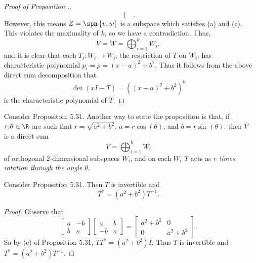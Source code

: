 \documentclass[linearalgebraII]{subfiles}
\begin{document}
\begin{proof}[Proof of Proposition \thechapter.\thestcounter]
\begin{equation*}
\begin{cases}
            \end{cases}.
        \end{equation*}
        However, this means $Z = \spn\left\lbrace v,w \right\rbrace$ is a subspace which satisfies (a) and (c). This violates the maximality of $k$, so we have a contradiction. Thus,
        \begin{equation*}
            V = W = \bigoplus^{k}_{i=1} W_i,
        \end{equation*}
        and it is clear that each $T_i:W_i\to W_i$, the restriction of $T$ on $W_i$, has characteristic polynomial $p_i = p = \left( x-a \right) ^{2} + b^{2}$. Thus it follows from the above direct sum decomposition that
        \begin{equation*}
            \det\left( xI-T \right) = \left( \left( x-a \right) ^{2} +b^{2}  \right) ^k
        \end{equation*}
        is the characteristic polynomial of $T$.
    \end{proof}

    \begin{remark}
        Consider Propositoin 5.31. Another way to state the proposition is that, if $r,\theta\in\R$ are such that $r=\sqrt{a^{2} +b^{2} }$, $a=r\cos(\theta)$, and $b=r\sin(\theta)$, then $V$ is a direct sum
        \begin{equation*}
            V = \bigoplus^{k}_{i=1} W_i
        \end{equation*}
        of orthogonal 2-dimensional subspaces $W_i$, and on each $W_i$ $T$ acts as \textit{$r$ times rotation through the angle $\theta$}.
    \end{remark}

    \begin{cor}{}
        Consider Proposition 5.31. Then $T$ is invertible and
        \begin{equation*}
            T^{*} = \left( a^{2} + b^{2}  \right) T^{-1} .
        \end{equation*}
    \end{cor}	

    \begin{proof}
        Observe that
        \begin{equation*}
            \begin{bmatrix}
                a & -b \\ b & a
            \end{bmatrix}
            \begin{bmatrix}
                a & b \\ -b & a
            \end{bmatrix}
            =
            \begin{bmatrix}
                a^{2} + b^{2} & 0 \\ 0 & a^{2} + b^{2} 
            \end{bmatrix}.
        \end{equation*}
        So by (c) of Proposition 5.31, $TT^{*} = \left( a^{2} + b^{2}  \right) I$. Thus $T$ is invertible and $T^{*} =\left( a^{2} +b^{2}  \right)T^{-1}$.
    \end{proof}
\end{document}
